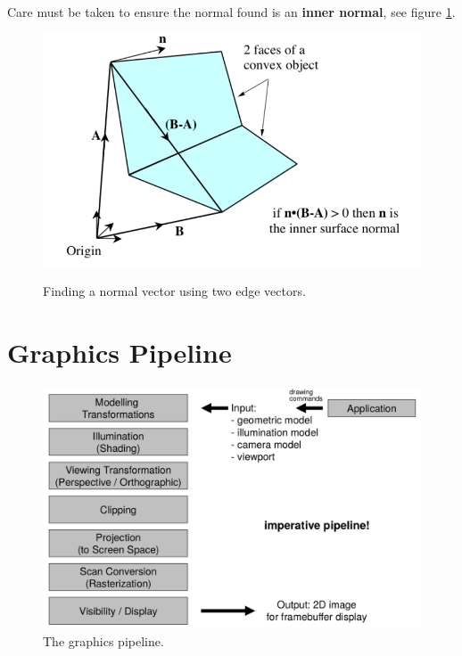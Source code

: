 \documentclass[11pt]{article}
\begin{document}
Care must be taken to ensure the normal found is an \textbf{inner normal}, see figure \ref{fig:innernormalcheck}.

\begin{figure}[htb!]
  \caption{Finding a normal vector using two edge vectors.}
  \includegraphics[scale=0.4]{innernormal}
  \label{fig:innernormalcheck}
  \centering
\end{figure}

\section{Graphics Pipeline}

\begin{figure}[htb!]
  \caption{The graphics pipeline.}
  \centering
  \includegraphics[scale=0.3]{pipeline}
\end{figure}
\end{document}
